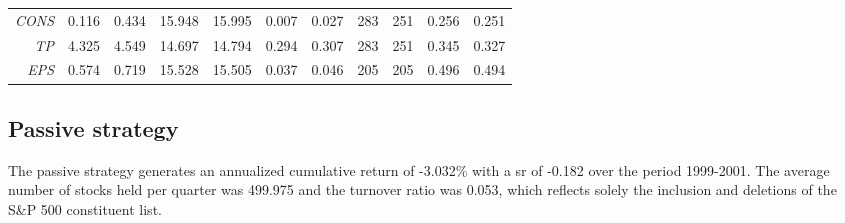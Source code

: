 \documentclass[a4paper,twoside,12pt,openright,notitlepage]{report}\usepackage[]{graphicx}\usepackage[]{color}
\begin{document}
\begin{table}[hp]
{\begin{tabular}{rrrrrrrrrrr}
  \textit{CONS}&0.116 & 0.434 & 15.948 & 15.995 & 0.007 & 0.027 &  283 &  251 & 0.256 & 0.251 \\ 
   \textit{TP}&4.325 & 4.549 & 14.697 & 14.794 & 0.294 & 0.307 &  283 &  251 & 0.345 & 0.327 \\ 
   \textit{EPS}&0.574 & 0.719 & 15.528 & 15.505 & 0.037 & 0.046 &  205 &  205 & 0.496 & 0.494 \\ 
   \midrule 

\end{tabular}}


\end{table}


\subsection{Passive strategy}

The passive strategy generates an annualized cumulative return of -3.032\% with a \gls{sr}  of -0.182 over the period 1999-2001. The average number of stocks held per quarter was 499.975 and the turnover ratio was 0.053, which reflects solely the inclusion and deletions  of the S\&P 500 constituent list.
\end{document}
